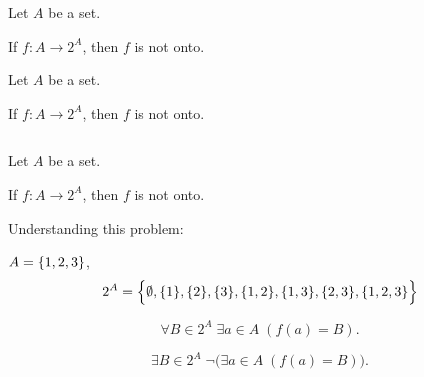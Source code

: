 \begin{frame}{}
  \begin{theorem}
    Let $A$ be a set. 

    If $f: A \to 2^{A}$, then $f$ is not onto.
  \end{theorem}

\end{frame}

\begin{frame}{}
  \begin{theorem}
    Let $A$ be a set. 

    If $f: A \to 2^{A}$, then $f$ is not onto.
  \end{theorem}

  \vspace{0.60cm}
  \begin{columns}
    \pause
    \pause
    \pause
    \pause
  \end{columns}
\end{frame}

\begin{frame}{}
  \begin{theorem}
    Let $A$ be a set. 

    If $f: A \to 2^{A}$, then $f$ is not onto.
  \end{theorem}

  \begin{exampleblock}{Understanding this problem:}
    \begin{description}
      \pause
      \item[$2^{A}$] $A = \{1,2,3\}$,
	\[
	  2^{A} = \Big\{\emptyset, \{1\}, \{2\}, \{3\}, \{1,2\}, \{1,3\}, \{2,3\}, \{1,2,3\}\Big\}
	\]
      \pause
      \item[Onto]
	\[
	  \forall B \in 2^{A}\; \exists a \in A\; (f(a) = B).
	\]
      \item[Not Onto]
	\[
	  \exists B \in 2^{A}\; \lnot \Big(\exists a \in A\; (f(a) = B)\Big).
	\]
    \end{description}
  \end{exampleblock}
\end{frame}

